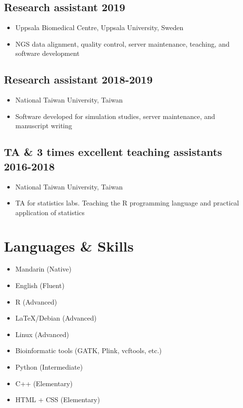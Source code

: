 \documentclass[10pt]{article}
\begin{document}
\subsection*{Research assistant \hfill 2019}
\begin{itemize}
\item Uppsala Biomedical Centre, Uppsala University, Sweden
\item NGS data alignment, quality control, server maintenance, teaching, and software development
\end{itemize}

\subsection*{Research assistant \hfill 2018-2019}
\begin{itemize}
\item National Taiwan University, Taiwan
\item Software developed for simulation studies, server maintenance, and manuscript writing
\end{itemize}

\subsection*{TA \& 3 times excellent teaching assistants \hfill 2016-2018}
\begin{itemize}
\item National Taiwan University, Taiwan
\item TA for statistics labs. Teaching the R programming language and practical application of statistics
\end{itemize}



\section*{Languages \& Skills}
\begin{multicols}{2}
\begin{itemize}
\item Mandarin (Native)
\item English (Fluent)
\item R (Advanced)
\item LaTeX/Debian (Advanced)
\item Linux (Advanced)
\item Bioinformatic tools (GATK, Plink, vcftools, etc.)
\item Python (Intermediate)
\item C++ (Elementary)
\item HTML + CSS (Elementary)
\end{itemize}
\end{multicols}
\end{document}
